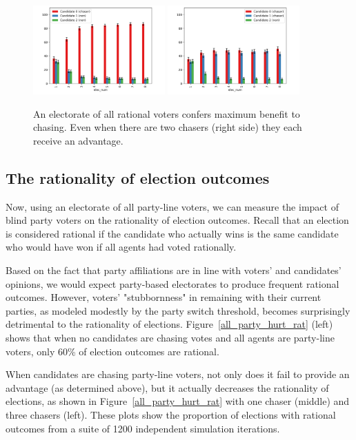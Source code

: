 \begin{figure}[ht]
\centering
\includegraphics[width=0.45\textwidth]{assets/all_rat_one_chaser_even_bigger_benefit.png}
\includegraphics[width=0.45\textwidth]{assets/all_rat_two_chasers_even_bigger_benefit.png}
\caption{An electorate of all rational voters confers maximum benefit to
chasing. Even when there are two chasers (right side) they each receive an
advantage.}
\label{all_rat_chasers_benefit}
\end{figure}


\subsection{The rationality of election outcomes}

Now, using an electorate of all party-line voters, we can measure the impact of
blind party voters on the rationality of election outcomes. Recall that an 
election is considered rational if the candidate who actually wins is the same 
candidate who would have won if all agents had voted rationally.
 
Based on the fact that party affiliations are in line with voters' and candidates' 
opinions, we would expect party-based electorates to produce frequent rational 
outcomes. However, voters' "stubbornness" in remaining with their current parties, 
as modeled modestly by the party switch threshold, becomes surprisingly detrimental
to the rationality of elections. Figure~\ref{all_party_hurt_rat} (left) shows that 
when no candidates are chasing votes and all agents are party-line voters, only 
60\% of election outcomes are rational. 

When candidates are chasing party-line voters, not only does it 
fail to provide an advantage (as determined above), but it actually decreases 
the rationality of elections, as shown in Figure~\ref{all_party_hurt_rat} with 
one chaser (middle) and three chasers (left). These plots show the proportion 
of elections with rational outcomes from a suite of 1200 independent simulation 
iterations.



